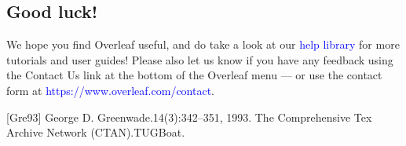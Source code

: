 \documentclass{article}
\begin{document}
\subsection{Good luck!}
We hope you find Overleaf useful, and do take a look at our\textcolor{blue}{ help library} for more tutorials and user
guides! Please also let us know if you have any feedback using the Contact Us link at the bottom of
the Overleaf menu — or use the contact form at \textcolor{blue}{https://www.overleaf.com/contact}.



\vspace{1cm}


\vspace{1cm}

[Gre93] George D. Greenwade.14(3):342–351, 1993.  The Comprehensive Tex Archive Network (CTAN).TUGBoat.
\end{document}

